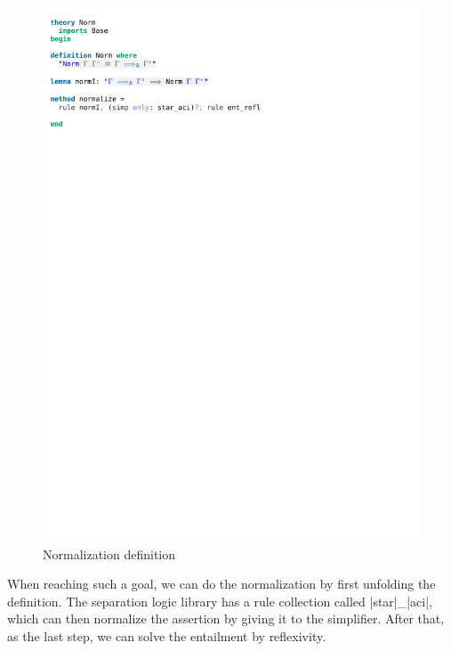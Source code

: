 \begin{figure}[htpb]
    \includegraphics[trim={0 26,2cm 0 2,4cm}, clip, width=1.00\textwidth]{figures/Theory_Norm.pdf}
    \caption[Normalization definition]{Normalization definition}
    \label{fig:norm}
\end{figure}

\noindent When reaching such a goal, we can do the normalization by first unfolding the definition. The separation logic library has a rule collection called |star|\_|aci|, which can then normalize the assertion by giving it to the simplifier. After that, as the last step, we can solve the entailment by reflexivity. 

